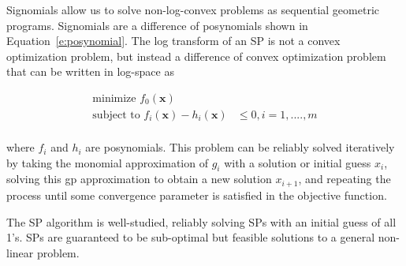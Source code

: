 Signomials allow us to solve non-log-convex problems as sequential geometric programs.
Signomials are a difference of posynomials shown in Equation~\ref{e:posynomial}.
The log transform of an SP is not a convex optimization problem, but instead a
difference of convex optimization problem that can be written in log-space as

\begin{equation}
\begin{aligned}
\text{minimize }f_{0}(\mathbf{x})& \\
\text{subject to }f_{i}(\mathbf{x}) - h_{i}(\mathbf{x})& \leq 0, i = 1, ...., m \\
\end{aligned}
\end{equation}

where $f_{i}$ and $h_{i}$ are posynomials. This problem can be reliably solved
iteratively by taking the monomial approximation of $g_{i}$ with a solution or
initial guess $x_{i}$, solving this \gls{gp} approximation to obtain a new solution $x_{i+1}$,
and repeating the process until some convergence parameter is satisfied in the objective function.

The SP algorithm is well-studied, reliably solving SPs with an initial guess of all 1’s.
SPs are guaranteed to be sub-optimal but feasible solutions to a general non-linear problem.

